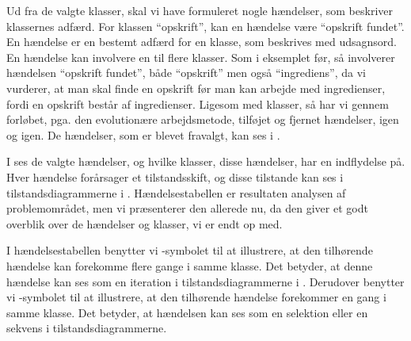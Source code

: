 Ud fra de valgte klasser, skal vi have formuleret nogle hændelser, som beskriver klassernes adfærd. For klassen ``opskrift'', kan en hændelse \fx være ``opskrift fundet''. En hændelse er en bestemt adfærd for en klasse, som beskrives med udsagnsord. En hændelse kan involvere en til flere klasser. Som i eksemplet før, så involverer hændelsen ``opskrift fundet'', både ``opskrift'' men også ``ingrediens'', da vi vurderer, at man skal finde en opskrift før man kan arbejde med ingredienser, fordi en opskrift består af ingredienser. Ligesom med klasser, så har vi gennem forløbet, pga. den evolutionære arbejdsmetode, tilføjet og fjernet hændelser, igen og igen. De hændelser, som er blevet fravalgt, kan ses i .

I  ses de valgte hændelser, og hvilke klasser, disse hændelser, har en indflydelse på. Hver hændelse forårsager et tilstandsskift, og disse tilstande kan ses i tilstandsdiagrammerne i . Hændelsestabellen er resultaten analysen af problemområdet, men vi præsenterer den allerede nu, da den giver et godt overblik over de hændelser og klasser, vi er endt op med. 

I hændelsestabellen benytter vi \iter-symbolet til at illustrere, at den tilhørende hændelse kan forekomme flere gange i samme klasse. Det betyder, at denne hændelse kan ses som en iteration i tilstandsdiagrammerne i . Derudover benytter vi \once-symbolet til at illustrere, at den tilhørende hændelse forekommer en gang i samme klasse. Det betyder, at hændelsen kan ses som en selektion eller en sekvens i tilstandsdiagrammerne.


